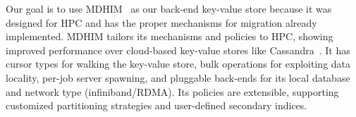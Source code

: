 Our goal is to use MDHIM~\cite{greenberg:hotstorage2015-mdhim} as our back-end
key-value store because it was designed for HPC and has the proper mechanisms
for migration already implemented.  MDHIM tailors its mechanisms and policies
to HPC, showing improved performance over cloud-based key-value stores like
Cassandra~\cite{lakshman_cassandra_2010}. It has cursor types for walking the
key-value store, bulk operations for exploiting data locality, per-job server
spawning, and pluggable back-ends for its local database and network type
(infiniband/RDMA). Its policies are extensible, supporting customized partitioning
strategies and user-defined secondary indices.
